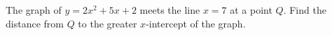The graph of $y=2x^2+5x+2$ meets the line $x=7$ at a point $Q$. Find the distance from $Q$ to the greater $x$-intercept of the graph.
